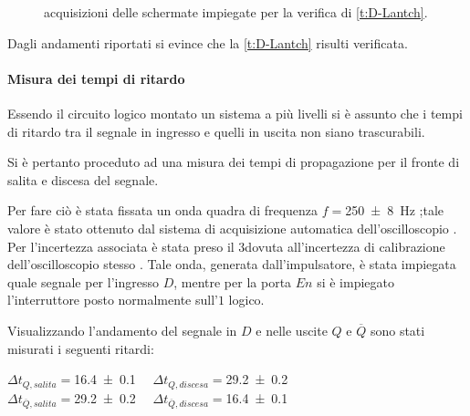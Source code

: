 \begin{figure}[htb]
{			\label{f:sci}
		}
		\caption{acquisizioni delle schermate impiegate per la verifica di \tablename{ \ref{t:D-Lantch}}.}
		\label{o:D-Latch}
	\end{figure}
	Dagli andamenti riportati si evince che la \tablename{ \ref{t:D-Lantch}}
	risulti verificata.
\paragraph{Misura dei tempi di ritardo}
	Essendo il circuito logico montato un sistema a più livelli
	si è assunto che i tempi di ritardo tra il segnale in ingresso e quelli in uscita non siano trascurabili.

	Si è pertanto proceduto ad una misura dei tempi di propagazione per il fronte di salita e discesa del segnale.

	Per fare ciò è stata fissata un onda quadra di frequenza $f=$\SI{250\pm 8}{\hertz} ;tale valore è stato ottenuto dal sistema di acquisizione automatica dell'oscilloscopio . Per l'incertezza associata  è stata preso il 3\textdiscount dovuta all'incertezza di calibrazione dell'oscilloscopio stesso .
	Tale onda, generata dall'impulsatore, è stata impiegata quale  segnale per l'ingresso $D$, mentre per la porta $En$ si è impiegato l'interruttore  posto normalmente sull'$1$ logico.

	Visualizzando l'andamento del segnale in $D$ e nelle uscite $Q$ e $\overline{Q}$
	sono stati misurati i seguenti ritardi:\\
	\begin{center}
		$ \Delta t_{Q,salita}=$\SI{16.4 \pm 0.1}{\nano \sec} \qquad $ \Delta t_{Q,discesa}=$\SI{29.2 \pm 0.2}{\nano \sec}\\
			$ \Delta t_{\overline{Q},salita}=$\SI{29.2 \pm 0.2}{\nano \sec} \qquad $ \Delta t_{\overline{Q},discesa}=$\SI{16.4 \pm 0.1}{\nano \sec}\\
	\end{center}

